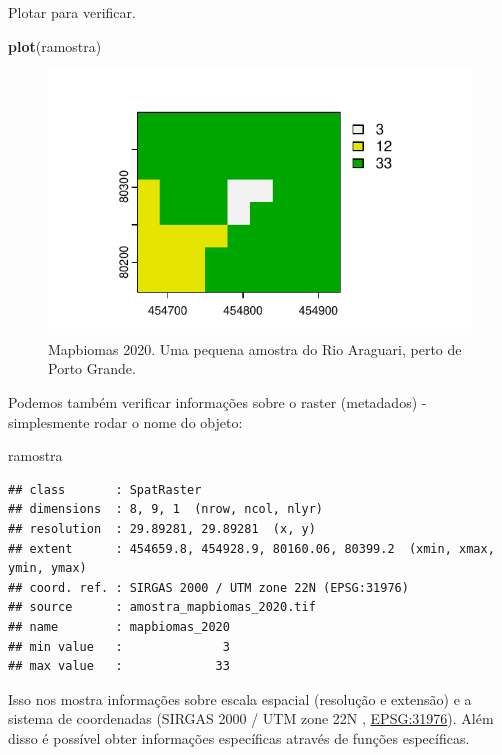 \documentclass[
]{article}
\newenvironment{Shaded}{\begin{snugshade}}{\end{snugshade}}
\newcommand{\FunctionTok}[1]{\textcolor[rgb]{0.13,0.29,0.53}{\textbf{#1}}}
\newcommand{\NormalTok}[1]{#1}
\begin{document}
Plotar para verificar.

\begin{Shaded}
\begin{Highlighting}[]
\FunctionTok{plot}\NormalTok{(ramostra)}
\end{Highlighting}
\end{Shaded}

\begin{figure}
\centering
\includegraphics{epr_files/figure-latex/plot-ramostra-1.pdf}
\caption{\label{fig:plot-ramostra}Mapbiomas 2020. Uma pequena amostra do Rio Araguari, perto de Porto Grande.}
\end{figure}

Podemos também verificar informações sobre o raster (metadados) - simplesmente rodar o nome do objeto:

\begin{Shaded}
\begin{Highlighting}[]
\NormalTok{ramostra}
\end{Highlighting}
\end{Shaded}

\begin{verbatim}
## class       : SpatRaster 
## dimensions  : 8, 9, 1  (nrow, ncol, nlyr)
## resolution  : 29.89281, 29.89281  (x, y)
## extent      : 454659.8, 454928.9, 80160.06, 80399.2  (xmin, xmax, ymin, ymax)
## coord. ref. : SIRGAS 2000 / UTM zone 22N (EPSG:31976) 
## source      : amostra_mapbiomas_2020.tif 
## name        : mapbiomas_2020 
## min value   :              3 
## max value   :             33
\end{verbatim}

Isso nos mostra informações sobre escala espacial (resolução e extensão) e a sistema de coordenadas (SIRGAS 2000 / UTM zone 22N , \href{https://epsg.io/31976}{EPSG:31976}). Além disso é possível obter informações específicas através de funções específicas.
\end{document}
